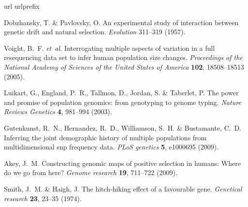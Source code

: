 \documentclass[12pt,a4paper]{article}
\begin{document}
{\scriptsize \sf
\renewcommand{\baselinestretch}{2.0}
%
%

\begin{thebibliography}{10}
\expandafter\ifx\csname url\endcsname\relax
  \def\url#1{\texttt{#1}}\fi
\expandafter\ifx\csname urlprefix\endcsname\relax\def\urlprefix{URL }\fi
\providecommand{\bibinfo}[2]{#2}
\providecommand{\eprint}[2][]{\url{#2}}

\bibinfo{author}{Dobzhansky, T.} \& \bibinfo{author}{Pavlovsky, O.}
\newblock \bibinfo{title}{An experimental study of interaction between genetic
  drift and natural selection}.
\newblock \emph{\bibinfo{journal}{Evolution}} \bibinfo{pages}{311--319}
  (\bibinfo{year}{1957}).

\bibinfo{author}{Voight, B.~F.} \emph{et~al.}
\newblock \bibinfo{title}{Interrogating multiple aspects of variation in a full
  resequencing data set to infer human population size changes}.
\newblock \emph{\bibinfo{journal}{Proceedings of the National Academy of
  Sciences of the United States of America}} \textbf{\bibinfo{volume}{102}},
  \bibinfo{pages}{18508--18513} (\bibinfo{year}{2005}).

\bibinfo{author}{Luikart, G.}, \bibinfo{author}{England, P.~R.},
  \bibinfo{author}{Tallmon, D.}, \bibinfo{author}{Jordan, S.} \&
  \bibinfo{author}{Taberlet, P.}
\newblock \bibinfo{title}{The power and promise of population genomics: from
  genotyping to genome typing}.
\newblock \emph{\bibinfo{journal}{Nature Reviews Genetics}}
  \textbf{\bibinfo{volume}{4}}, \bibinfo{pages}{981--994}
  (\bibinfo{year}{2003}).

\bibinfo{author}{Gutenkunst, R.~N.}, \bibinfo{author}{Hernandez, R.~D.},
  \bibinfo{author}{Williamson, S.~H.} \& \bibinfo{author}{Bustamante, C.~D.}
\newblock \bibinfo{title}{Inferring the joint demographic history of multiple
  populations from multidimensional snp frequency data}.
\newblock \emph{\bibinfo{journal}{PLoS genetics}} \textbf{\bibinfo{volume}{5}},
  \bibinfo{pages}{e1000695} (\bibinfo{year}{2009}).

\bibinfo{author}{Akey, J.~M.}
\newblock \bibinfo{title}{Constructing genomic maps of positive selection in
  humans: Where do we go from here?}
\newblock \emph{\bibinfo{journal}{Genome research}}
  \textbf{\bibinfo{volume}{19}}, \bibinfo{pages}{711--722}
  (\bibinfo{year}{2009}).

\bibinfo{author}{Smith, J.~M.} \& \bibinfo{author}{Haigh, J.}
\newblock \bibinfo{title}{The hitch-hiking effect of a favourable gene}.
\newblock \emph{\bibinfo{journal}{Genetical research}}
  \textbf{\bibinfo{volume}{23}}, \bibinfo{pages}{23--35}
  (\bibinfo{year}{1974}).


\end{thebibliography}}
\end{document}
